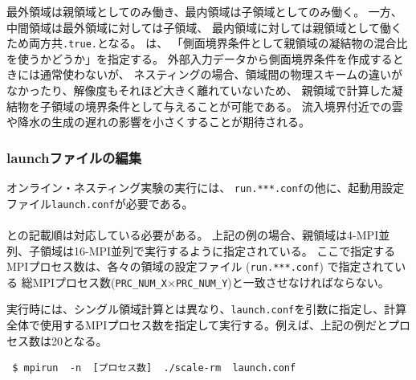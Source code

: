 \noindent 最外領域は親領域としてのみ働き、最内領域は子領域としてのみ働く。
一方、中間領域は最外領域に対しては子領域、
最内領域に対しては親領域として働くため両方共\verb|.true.|となる。
は、
「側面境界条件として親領域の凝結物の混合比を使うかどうか」を指定する。
外部入力データから側面境界条件を作成するときには通常使わないが、
ネスティングの場合、領域間の物理スキームの違いがなかったり、解像度もそれほど大きく離れていないため、
親領域で計算した凝結物を子領域の境界条件として与えることが可能である。
流入境界付近での雲や降水の生成の遅れの影響を小さくすることが期待される。



\subsubsection{launchファイルの編集}
\label{subsubsec:launch}
オンライン・ネスティング実験の実行には、
\verb|run.***.conf|の他に、起動用設定ファイル\verb|launch.conf|が必要である。\\

\\

\noindent 
{}との記載順は対応している必要がある。
上記の例の場合、親領域は4-MPI並列、子領域は16-MPI並列で実行するように指定されている。
ここで指定するMPIプロセス数は、各々の領域の設定ファイル (\verb|run.***.conf|) で指定されている
総MPIプロセス数(\verb|PRC_NUM_X|$\times$\verb|PRC_NUM_Y|)と一致させなければならない。

実行時には、シングル領域計算とは異なり、\verb|launch.conf|を引数に指定し、計算全体で使用するMPIプロセス数を指定して実行する。例えば、上記の例だとプロセス数は20となる。
\begin{verbatim}
 $ mpirun  -n  [プロセス数]  ./scale-rm  launch.conf
\end{verbatim}

